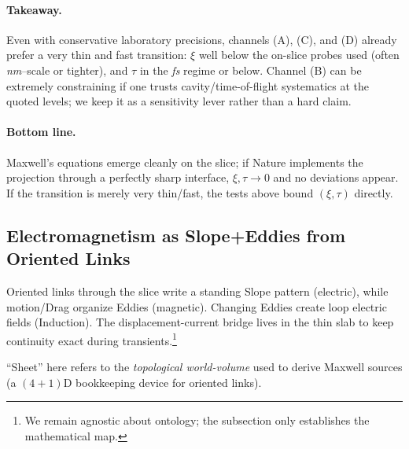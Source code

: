 \paragraph{Takeaway.} Even with conservative laboratory precisions, channels (A), (C), and (D) already prefer a very thin and fast transition: $\xi$ well below the on-slice probes used (often \textit{nm}–scale or tighter), and $\tau$ in the \textit{fs} regime or below. Channel (B) can be extremely constraining if one trusts cavity/time-of-flight systematics at the quoted levels; we keep it as a sensitivity lever rather than a hard claim.

\paragraph{Bottom line.}
Maxwell's equations emerge cleanly on the slice; if Nature implements the projection through a perfectly sharp interface, $\xi,\tau\!\to\!0$ and no deviations appear. If the transition is merely very thin/fast, the tests above bound $(\xi,\tau)$ directly.

\subsection{Electromagnetism as Slope+Eddies from Oriented Links}
\label{sec:EM-from-helical-vortices}

\begin{tcolorbox}[title=Plain-language snapshot (30 seconds)]
Oriented links through the slice write a standing Slope pattern (electric), while motion/Drag organize Eddies (magnetic). Changing Eddies create loop electric fields (Induction). The displacement-current bridge lives in the thin slab to keep continuity exact during transients.\footnote{We remain agnostic about ontology; the subsection only establishes the mathematical map.}
\end{tcolorbox}

\begin{tcolorbox}[title=Terminology note]
``Sheet'' here refers to the \emph{topological world-volume} used to derive Maxwell sources (a $(4{+}1)$D bookkeeping device for oriented links).
\end{tcolorbox}

